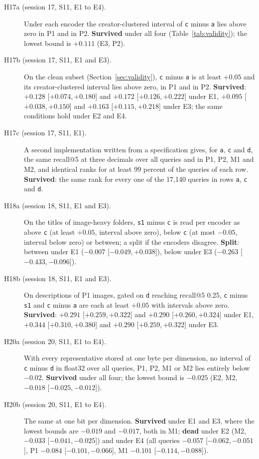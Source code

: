 \documentclass[11pt]{article}
\newcommand{\rep}[1]{\texttt{#1}}
\newcommand{\ci}[2]{[\ensuremath{#1},\,\ensuremath{#2}]}  %
\begin{document}
\begin{description}
\item[H17a (session 17, S11, E1 to E4).] Under each encoder the creator-clustered interval of \rep{c} minus \rep{a} lies above zero in P1 and in P2. \textbf{Survived} under all four (Table~\ref{tab:validity}); the lowest bound is $+0.111$ (E3, P2).
\item[H17b (session 17, S11, E1 and E3).] On the clean subset (Section~\ref{sec:validity}), \rep{c} minus \rep{a} is at least $+0.05$ and its creator-clustered interval lies above zero, in P1 and in P2. \textbf{Survived}: $+0.128$ \ci{+0.074}{+0.180} and $+0.172$ \ci{+0.126}{+0.222} under E1, $+0.095$ \ci{+0.038}{+0.150} and $+0.163$ \ci{+0.115}{+0.218} under E3; the same conditions hold under E2 and E4.
\item[H17c (session 17, S11, E1).] A second implementation written from a specification gives, for \rep{a}, \rep{c} and \rep{d}, the same recall@5 at three decimals over all queries and in P1, P2, M1 and M2, and identical ranks for at least 99 percent of the queries of each row. \textbf{Survived}: the same rank for every one of the 17,140 queries in rows \rep{a}, \rep{c} and \rep{d}.
\item[H18a (session 18, S11, E1 and E3).] On the titles of image-heavy folders, \rep{s1} minus \rep{c} is read per encoder as above \rep{c} (at least $+0.05$, interval above zero), below \rep{c} (at most $-0.05$, interval below zero) or between; a split if the encoders disagree. \textbf{Split}: between under E1 ($-0.007$ \ci{-0.049}{+0.038}), below under E3 ($-0.263$ \ci{-0.433}{-0.096}).
\item[H18b (session 18, S11, E1 and E3).] On descriptions of P1 images, gated on \rep{d} reaching recall@5 0.25, \rep{c} minus \rep{s1} and \rep{c} minus \rep{a} are each at least $+0.05$ with intervals above zero. \textbf{Survived}: $+0.291$ \ci{+0.259}{+0.322} and $+0.290$ \ci{+0.260}{+0.324} under E1, $+0.344$ \ci{+0.310}{+0.380} and $+0.290$ \ci{+0.259}{+0.322} under E3.
\item[H20a (session 20, S11, E1 to E4).] With every representative stored at one byte per dimension, no interval of \rep{c} minus \rep{d} in float32 over all queries, P1, P2, M1 or M2 lies entirely below $-0.02$. \textbf{Survived} under all four; the lowest bound is $-0.025$ (E2, M2, $-0.018$ \ci{-0.025}{-0.012}).
\item[H20b (session 20, S11, E1 to E4).] The same at one bit per dimension. \textbf{Survived} under E1 and E3, where the lowest bounds are $-0.019$ and $-0.017$, both in M1; \textbf{dead} under E2 (M2, $-0.033$ \ci{-0.041}{-0.025}) and under E4 (all queries $-0.057$ \ci{-0.062}{-0.051}, P1 $-0.084$ \ci{-0.101}{-0.066}, M1 $-0.101$ \ci{-0.114}{-0.088}).

\end{description}
\end{document}
